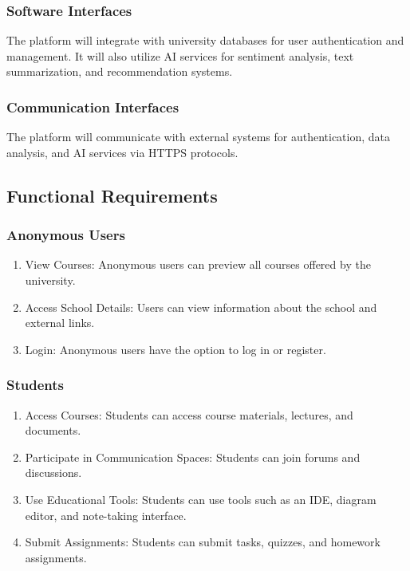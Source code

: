 \documentclass{IEEEtran}
\begin{document}
\subsubsection{Software Interfaces}
The platform will integrate with university databases for user authentication and management. It will also utilize AI services for sentiment analysis, text summarization, and recommendation systems.

\subsubsection{Communication Interfaces}
The platform will communicate with external systems for authentication, data analysis, and AI services via HTTPS protocols.

\subsection{Functional Requirements}

\subsubsection{Anonymous Users}
\begin{enumerate}[noitemsep]
\item View Courses: Anonymous users can preview all courses offered by the university.
\item Access School Details: Users can view information about the school and external links.
\item Login: Anonymous users have the option to log in or register.
\end{enumerate}

\subsubsection{Students}
\begin{enumerate}[noitemsep]
\item Access Courses: Students can access course materials, lectures, and documents.
\item Participate in Communication Spaces: Students can join forums and discussions.
\item Use Educational Tools: Students can use tools such as an IDE, diagram editor, and note-taking interface.
\item Submit Assignments: Students can submit tasks, quizzes, and homework assignments.
\end{enumerate}
\end{document}
